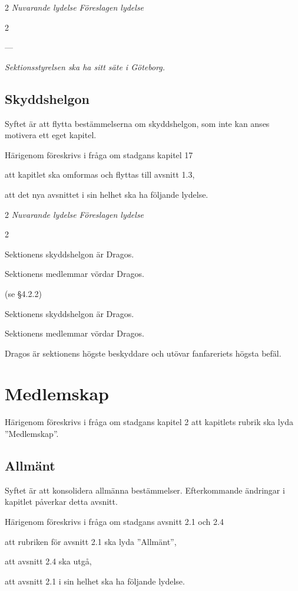 \documentclass{article}
\newenvironment{lydelse}
    {\begin{paracol}{2}%
        \emph{Nuvarande lydelse}%
        \switchcolumn%
        \emph{Föreslagen lydelse}%
    \end{paracol}%
    \begin{enumerate}[label=\thesubsection.\arabic*]%
    \begin{paracol}{2}%
    }{\end{paracol}\end{enumerate}}
\begin{document}
\begin{lydelse}
    ---
  \switchcolumn
  \setcounter{enumi}{1}
    \item \emph{Sektionsstyrelsen ska ha sitt säte i Göteborg.}
\end{lydelse}

\subsection{Skyddshelgon}
Syftet är att flytta bestämmelserna om skyddshelgon, som inte kan anses motivera
ett eget kapitel.

Härigenom föreskrivs i fråga om stadgans kapitel 17
\begin{dels}
    \item att kapitlet ska omformas och flyttas till avsnitt 1.3,
    \item att det nya avsnittet i sin helhet ska ha följande lydelse.
\end{dels}

\begin{lydelse}
  \setcounter{section}{17}
  \setcounter{subsection}{1}
    \item Sektionens skyddshelgon är Dragos.
    \item Sektionens medlemmar vördar Dragos.
    \item[] (se \S 4.2.2)
  \setcounter{section}{1}
  \setcounter{subsection}{3}
  \switchcolumn   
  \setcounter{enumi}{0}
    \item Sektionens skyddshelgon är Dragos.
    \item Sektionens medlemmar vördar Dragos.
    \item Dragos är sektionens högste beskyddare och utövar fanfareriets högsta
      befäl.
      \label{1.3:beskyddare}
\end{lydelse}

\section{Medlemskap}
Härigenom föreskrivs i fråga om stadgans kapitel 2 att kapitlets rubrik ska lyda
''Medlemskap''.

\subsection{Allmänt}
Syftet är att konsolidera allmänna bestämmelser.
Efterkommande ändringar i kapitlet påverkar detta avsnitt.

Härigenom föreskrivs i fråga om stadgans avsnitt 2.1 och 2.4
\begin{dels}
    \item att rubriken för avsnitt 2.1 ska lyda ''Allmänt'',
    \item att avsnitt 2.4 ska utgå,
    \item att avsnitt 2.1 i sin helhet ska ha följande lydelse.
\end{dels}
\end{document}
